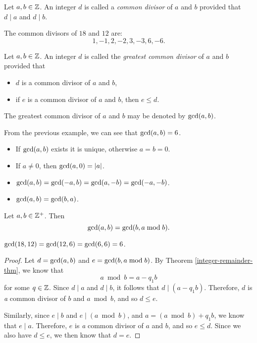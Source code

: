 \begin{defn}
    Let $a, b \in \mathbb{Z}$. An integer $d$ is called a \emph{common divisor} of $a$ and $b$ provided that $d \mid a$ and $d \mid b$.
\end{defn}

\begin{exmp}
    The common divisors of $18$ and $12$ are: \[1, -1, 2, -2, 3, -3, 6, -6.\]
\end{exmp}

\begin{defn}
    Let $a, b \in \mathbb{Z}$. An integer $d$ is called the \emph{greatest common divisor} of $a$ and $b$ provided that
    \begin{itemize}
        \item $d$ is a common divisor of $a$ and $b$,
        \item if $e$ is a common divisor of $a$ and $b$, then $e \leq d$.
    \end{itemize}
    The greatest common divisor of $a$ and $b$ may be denoted by $\operatorname{gcd}(a, b)$.
\end{defn}

\begin{exmp}
    From the previous example, we can see that $\operatorname{gcd}(a, b) = 6$.
\end{exmp}

\begin{rmk}\proofbreak
    \begin{itemize}
        \item If $\operatorname{gcd}(a, b)$ exists it is unique, otherwise $a = b = 0$.
        \item If $a \neq 0$, then $\operatorname{gcd}(a, 0) = |a|$.
        \item $\operatorname{gcd}(a, b) = \operatorname{gcd}(-a, b) = \operatorname{gcd}(a, -b) = \operatorname{gcd}(-a, -b)$.
        \item $\operatorname{gcd}(a, b) = \operatorname{gcd}(b, a)$.
    \end{itemize}
\end{rmk}

\begin{prop}\label{euclidean-division-property}
    Let $a, b \in \mathbb{Z}^+$. Then \[\operatorname{gcd}(a, b) = \operatorname{gcd}(b, a \bmod b).\]
\end{prop}

\begin{exmp}
    $\operatorname{gcd}(18, 12) = \operatorname{gcd}(12, 6) = \operatorname{gcd}(6, 6) = 6$.
\end{exmp}

\begin{proof}
    Let $d = \operatorname{gcd}(a, b)$ and $e = \operatorname{gcd}(b, a \bmod b)$. By Theorem \ref{integer-remainder-thm}, we know that \[a \bmod b = a - q_1b\] for some $q \in \mathbb{Z}$. Since $d \mid a$ and $d \mid b$, it follows that $d \mid (a - q_1b)$. Therefore, $d$ is \emph{a} common divisor of $b$ and $a \bmod b$, and so $d \leq e$.

    Similarly, since $e \mid b$ and $e \mid (a \bmod b)$, and $a = (a \bmod b) + q_1b$, we know that $e \mid a$. Therefore, $e$ is \emph{a} common divisor of $a$ and $b$, and so $e \leq d$. Since we also have $d \leq e$, we then know that $d = e$.
\end{proof}

